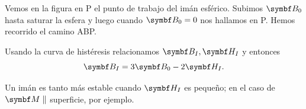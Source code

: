 \documentclass[10pt,oneside]{CBFT_book}
\begin{document}
Vemos en la figura en P el punto de trabajo del imán esférico. Subimos $\vb{B}_0$ hasta saturar la
esfera y luego cuando $\vb{B}_0 = 0$ nos hallamos en P. Hemos recorrido el camino ABP.

Usando la curva de histéresis relacionamos $\vb{B}_I, \vb{H}_I$ y entonces
\[
	\vb{B}_I = 3 \vb{B}_0  - 2 \vb{H}_I.
\]

Un imán es tanto más estable cuando $\vb{H}_I$ es pequeño; en el caso de $\vb{M} \parallel$ superficie,
por ejemplo.

\end{document}
